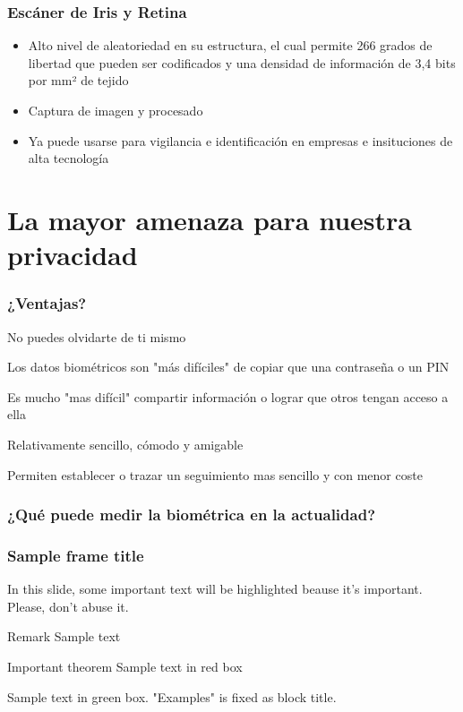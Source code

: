 \documentclass{beamer}
\begin{document}
\begin{frame}
\begin{frame}
\frametitle{Escáner de Iris y Retina}
\begin{itemize}
    \item<1-> Alto nivel de aleatoriedad en su estructura, el cual permite 266 grados de libertad que pueden ser codificados y una densidad de información de 3,4 bits por mm² de tejido
    \item<2-> Captura de imagen y procesado
    \item<3-> Ya puede usarse para vigilancia e identificación en empresas e insituciones de alta tecnología
\end{itemize}
\end{frame}


\section{La mayor amenaza para nuestra privacidad}

\frametitle{¿Ventajas?}
    \item<1-> No puedes olvidarte de ti mismo 
    \item<2-> Los datos biométricos son "más difíciles" de copiar que una contraseña o un PIN 
    \item<3-> Es mucho "mas difícil" compartir información o lograr que otros tengan acceso a ella
    \item<4-> Relativamente sencillo, cómodo y amigable
    \item<5-> Permiten establecer o trazar un seguimiento mas sencillo y con menor coste 
\end{frame}

\begin{frame}
\frametitle{¿Qué puede medir la biométrica en la actualidad?}

\end{frame}
\begin{frame}
\frametitle{Sample frame title}

In this slide, some important text will be
\alert{highlighted} beause it's important.
Please, don't abuse it.

\begin{block}{Remark}
Sample text
\end{block}

\begin{alertblock}{Important theorem}
Sample text in red box
\end{alertblock}

\begin{examples}
Sample text in green box. "Examples" is fixed as block title.
\end{examples}
\end{frame}
\end{document}
